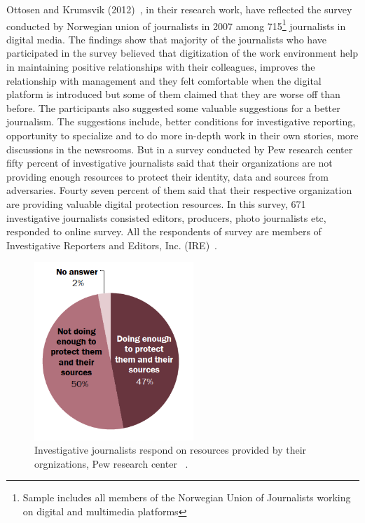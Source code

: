  Ottosen and Krumsvik (2012)~\cite{ottosen2012digital}, in their research work, have reflected the survey conducted by Norwegian union of journalists in 2007 among 715\footnote{Sample includes all members of the
 Norwegian Union of Journalists working on digital and multimedia platforms} journalists in digital media. The findings show that majority of the journalists who have participated in the survey believed that digitization of the work environment help in maintaining positive relationships with their colleagues, improves the relationship with management and they felt comfortable when the digital platform is introduced but some of them claimed that they are worse off than before. The participants also suggested some valuable suggestions for a better journalism. The suggestions include, better conditions for investigative reporting, opportunity to specialize and to do more in-depth work in their own stories, more discussions in the newsrooms. But in a survey conducted by Pew research center~\cite{ia2p}  fifty percent of investigative journalists said that their organizations are not providing enough resources to protect their identity, data and sources from adversaries. Fourty seven percent of them said that their respective organization are providing valuable digital protection resources. In this survey, 671 investigative journalists consisted editors, producers, photo journalists etc, responded to online survey. All the respondents of survey are members of Investigative Reporters and Editors, Inc. (IRE)~\cite{ia2p}. \\
\begin{figure}[ht!]
	\centering
	\includegraphics[width=60mm]{1.png}
	\caption{Investigative journalists respond on resources provided by their orgnizations, Pew research center ~\cite{ia2p}.}
	\label{fig:0}
\end{figure} 

